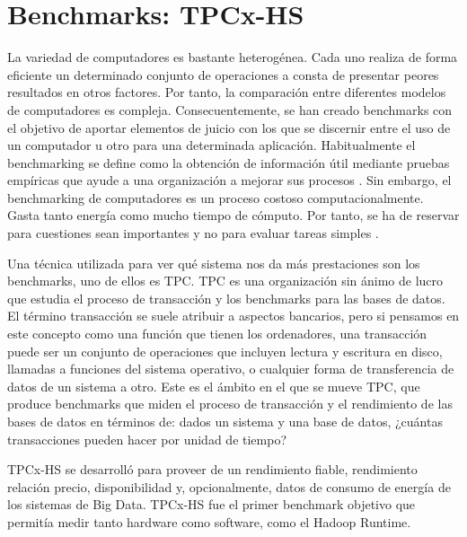 \documentclass[10pt]{article}
\begin{document}

\section{Benchmarks: TPCx-HS} \label{sec:tpcx-hs}

	La variedad de computadores es bastante heterogénea. Cada uno realiza de forma eficiente un determinado conjunto de operaciones a consta de presentar peores resultados en otros factores. Por tanto, la comparación entre diferentes modelos de computadores es compleja. Consecuentemente, se han creado benchmarks con el objetivo de aportar elementos de juicio con los que se discernir entre el uso de un computador u otro para una determinada aplicación. Habitualmente el benchmarking se define como la obtención de información útil mediante pruebas empíricas que ayude a una organización a mejorar sus procesos \cite{benchmarking}. Sin embargo, el benchmarking de computadores es un proceso costoso computacionalmente. Gasta tanto energía como mucho tiempo de cómputo. Por tanto, se ha de reservar para cuestiones sean importantes y no para evaluar tareas simples \cite{desv-bench}.
	
	Una técnica utilizada para ver qué sistema nos da más prestaciones son los benchmarks, uno de ellos es TPC. TPC es una organización sin ánimo de lucro que estudia el proceso de transacción y los benchmarks para las bases de datos. El término transacción se suele atribuir a aspectos bancarios, pero si pensamos en este concepto como una función que tienen los ordenadores, una transacción puede ser un conjunto de operaciones que incluyen lectura y escritura en disco, llamadas a funciones del sistema operativo, o cualquier forma de transferencia de datos de un sistema a otro. Este es el ámbito en el que se mueve TPC, que produce benchmarks que miden el proceso de transacción y el rendimiento de las bases de datos en términos de: dados un sistema y una base de datos, ¿cuántas transacciones pueden hacer por unidad de tiempo?\cite{intro-tpc}
	
	TPCx-HS se desarrolló para proveer de un rendimiento fiable, rendimiento relación precio, disponibilidad y, opcionalmente, datos de consumo de energía de los sistemas de Big Data. TPCx-HS fue el primer benchmark objetivo que permitía medir tanto hardware como software, como el Hadoop Runtime. \cite{info-tpc}
	
\end{document}
